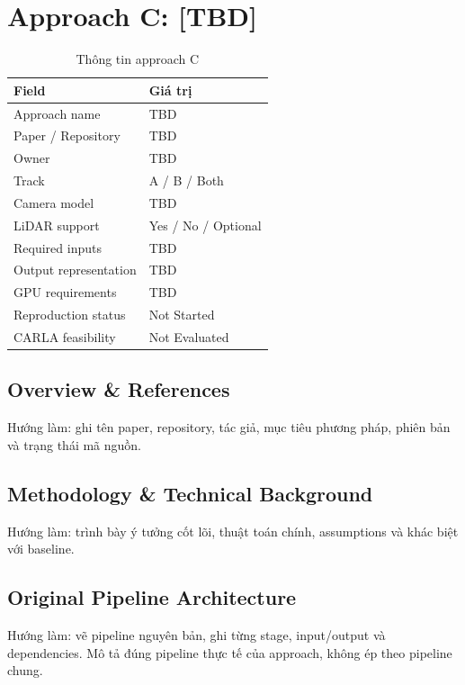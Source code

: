 \chapter{Approach C: [TBD]}

\begin{table}[H]
  \centering
  \caption{Thông tin approach C}
  \begin{tabularx}{\linewidth}{l X}
    \toprule
    \textbf{Field} & \textbf{Giá trị} \\
    \midrule
    Approach name & TBD \\
    Paper / Repository & TBD \\
    Owner & TBD \\
    Track & A / B / Both \\
    Camera model & TBD \\
    LiDAR support & Yes / No / Optional \\
    Required inputs & TBD \\
    Output representation & TBD \\
    GPU requirements & TBD \\
    Reproduction status & Not Started \\
    CARLA feasibility & Not Evaluated \\
    \bottomrule
  \end{tabularx}
\end{table}

\section{Overview \& References}

Hướng làm: ghi tên paper, repository, tác giả, mục tiêu phương pháp, phiên bản và trạng thái mã nguồn.

\section{Methodology \& Technical Background}

Hướng làm: trình bày ý tưởng cốt lõi, thuật toán chính, assumptions và khác biệt với baseline.

\section{Original Pipeline Architecture}

Hướng làm: vẽ pipeline nguyên bản, ghi từng stage, input/output và dependencies.
Mô tả đúng pipeline thực tế của approach, không ép theo pipeline chung.

